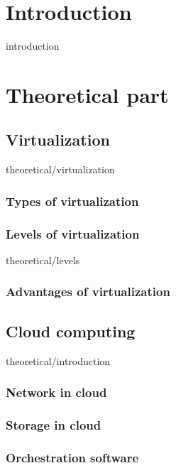 \documentclass[12pt,oneside,a4paper]{report} %
\begin{document}
\tableofcontents
\cleardoublepage

\pagestyle{plain}

\chapter{Introduction}
{introduction}

\chapter{Theoretical part}
	\section{Virtualization}
		{theoretical/virtualization}

		\subsection{Types of virtualization}
		\subsection{Levels of virtualization}
			{theoretical/levels}
		\subsection{Advantages of virtualization}
	\section{Cloud computing}
		{theoretical/introduction}


		\subsection{Network in cloud}
		\subsection{Storage in cloud}

		\subsection{Orchestration software}
\end{document}
